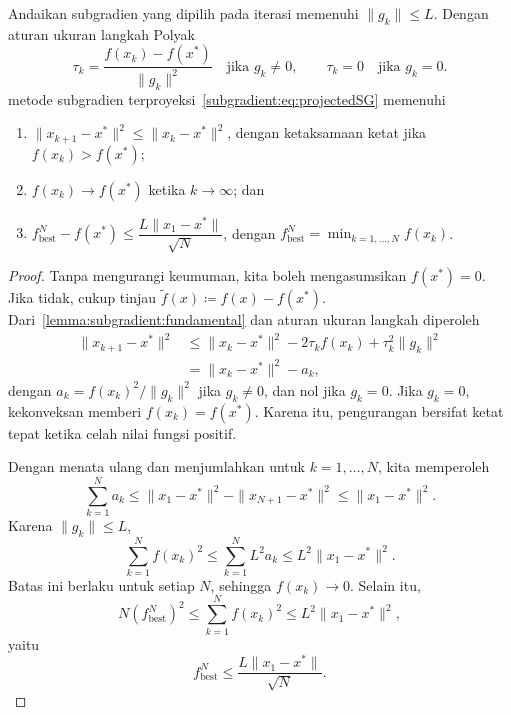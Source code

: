 \begin{theorem}
    Andaikan subgradien yang dipilih pada iterasi memenuhi \(\|g_k\|\leq L\). Dengan aturan ukuran langkah Polyak
    \begin{equation}
        \tau_k = \frac{f(x_k)-f(x^*)}{\|g_k\|^2}\quad\text{jika }g_k\neq0,
        \qquad \tau_k=0\quad\text{jika }g_k=0.
    \end{equation}
    metode subgradien terproyeksi~\eqref{subgradient:eq:projectedSG} memenuhi
    \begin{enumerate}
        \item \(\|x_{k+1}-x^*\|^2\leq \|x_k-x^*\|^2\), dengan ketaksamaan ketat jika \(f(x_k)>f(x^*)\);
        \item \(f(x_k)\rightarrow f(x^*)\) ketika \(k\rightarrow\infty\); dan
        \item \(f_{\mathrm{best}}^N-f(x^*)\leq \dfrac{L\|x_1-x^*\|}{\sqrt{N}}\), dengan \(f_{\mathrm{best}}^N = \min_{k=1,\dots,N}f(x_k)\).
    \end{enumerate}
\end{theorem}
\begin{proof}
    Tanpa mengurangi keumuman, kita boleh mengasumsikan \(f(x^*)=0\). Jika tidak, cukup tinjau \(\widetilde f(x)\coloneq f(x)-f(x^*)\). Dari~\cref{lemma:subgradient:fundamental} dan aturan ukuran langkah diperoleh
    \begin{equation}
        \begin{aligned}
            \|x_{k+1}-x^*\|^2
            &\leq \|x_k - x^*\|^2 - 2\tau_k f(x_k) +\tau_k^2\|g_k\|^2\\
            &= \|x_k - x^*\|^2 - a_k,
        \end{aligned}
    \end{equation}
    dengan \(a_k=f(x_k)^2/\|g_k\|^2\) jika \(g_k\neq0\), dan nol jika \(g_k=0\). Jika \(g_k=0\), kekonveksan memberi \(f(x_k)=f(x^*)\). Karena itu, pengurangan bersifat ketat tepat ketika celah nilai fungsi positif.

    Dengan menata ulang dan menjumlahkan untuk \(k=1,\dots,N\), kita memperoleh
    \begin{equation}
        \sum_{k=1}^{N} a_k
        \leq \|x_1-x^*\|^2 - \|x_{N+1}-x^*\|^2
        \leq \|x_1-x^*\|^2.
    \end{equation}
    Karena \(\|g_k\|\leq L\),
    \begin{equation}
        \sum_{k=1}^{N} f(x_k)^2
        \leq \sum_{k=1}^{N} L^2 a_k
        \leq L^2 \|x_1-x^*\|^2.
    \end{equation}
    Batas ini berlaku untuk setiap \(N\), sehingga \(f(x_k)\rightarrow0\). Selain itu,
    \begin{equation}
        N (f_{\mathrm{best}}^N)^2
        \leq \sum_{k=1}^{N} f(x_k)^2
        \leq L^2\|x_1-x^*\|^2,
    \end{equation}
    yaitu
    \begin{equation}
        f_{\mathrm{best}}^N\leq \frac{L\|x_1-x^*\|}{\sqrt{N}}.
    \end{equation}
\end{proof}

